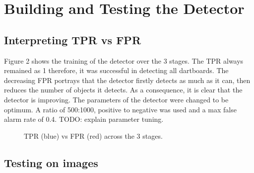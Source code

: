 \documentclass[a4paper]{article}
\begin{document}
\section*{Building and Testing the Detector}
\subsection*{Interpreting TPR vs FPR}
\vspace{-0.7em}

Figure 2 shows the training of the detector over the 3 stages. The TPR always
remained as 1 therefore, it was successful in detecting all dartboards. The
decreasing FPR portrays that the detector firstly detects as much as it can,
then reduces the number of objects it detects. As a consequence, it is clear
that the detector is improving. The parameters of the detector were changed to be optimum. A ratio of 500:1000, positive to negative was used and a max false alarm rate of 0.4. TODO: explain parameter tuning.

\begin{figure}[H]
  \centering
  \caption{TPR (blue) vs FPR (red) across the 3 stages.}
\end{figure}

\subsection*{Testing on images}
\vspace{-0.7em}
\end{document}
